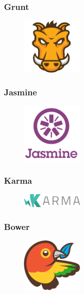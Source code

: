 \subsubsection{Grunt}
\begin{figure}
\includegraphics[width=3cm]{img/mobile-app/logos/grunt.png}
\end{figure} 


\subsubsection{Jasmine}
\begin{figure}
\includegraphics[width=3cm]{img/mobile-app/logos/jasmine.png}
\end{figure} 


\subsubsection{Karma}
\begin{figure}
\includegraphics[width=3cm]{img/mobile-app/logos/karma.png}
\end{figure} 


\subsubsection{Bower}
\begin{figure}
\includegraphics[width=3cm]{img/mobile-app/logos/bower.png}
\end{figure} 


